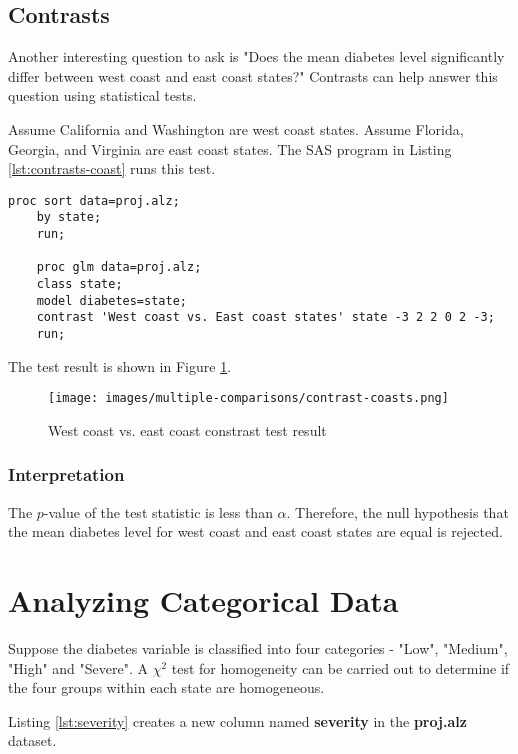 \documentclass{article}
\begin{document}
\subsection{Contrasts}
Another interesting question to ask is "Does the mean diabetes level significantly differ between west coast and east coast states?" Contrasts can help answer this question using statistical tests.

Assume California and Washington are west coast states. Assume Florida, Georgia, and Virginia are east coast states. The SAS program in Listing \ref{lst:contrasts-coast} runs this test.

\begin{lstlisting}[language=SAS,caption=Contrast SAS program comparing west coast and east coast states,captionpos=b,label=lst:contrasts-coast]
    proc sort data=proj.alz;
    by state;
    run;
    
    proc glm data=proj.alz;
    class state;
    model diabetes=state;
    contrast 'West coast vs. East coast states' state -3 2 2 0 2 -3;
    run;
\end{lstlisting}

The test result is shown in Figure \ref{fig:mc-coast-result}.

\begin{figure}[ht]
    \centering
    \texttt{[image: images/multiple-comparisons/contrast-coasts.png]}
    \caption{West coast vs. east coast constrast test result}
    \label{fig:mc-coast-result}
\end{figure}

\subsubsection{Interpretation}
The $p$-value of the test statistic is less than $\alpha$. Therefore, the null hypothesis that the mean diabetes level for west coast and east coast states are equal is rejected.

\section{Analyzing Categorical Data}
Suppose the diabetes variable is classified into four categories - "Low", "Medium", "High" and "Severe". A $\chi^2$ test for homogeneity can be carried out to determine if the four groups within each state are homogeneous.

Listing \ref{lst:severity} creates a new column named \textbf{severity} in the \textbf{proj.alz} dataset. 
\end{document}

